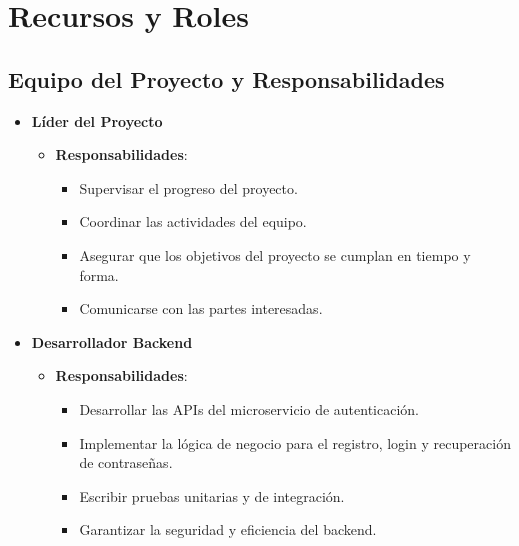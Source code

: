 \documentclass{article}
\begin{document}
\section{Recursos y Roles}

\subsection{Equipo del Proyecto y Responsabilidades}

\begin{itemize}
    \item \textbf{Líder del Proyecto}
          \begin{itemize}
              \item \textbf{Responsabilidades}:
                    \begin{itemize}
                        \item Supervisar el progreso del proyecto.
                        \item Coordinar las actividades del equipo.
                        \item Asegurar que los objetivos del proyecto se cumplan en tiempo y forma.
                        \item Comunicarse con las partes interesadas.
                    \end{itemize}
          \end{itemize}

    \item \textbf{Desarrollador Backend}
          \begin{itemize}
              \item \textbf{Responsabilidades}:
                    \begin{itemize}
                        \item Desarrollar las APIs del microservicio de autenticación.
                        \item Implementar la lógica de negocio para el registro, login y recuperación de contraseñas.
                        \item Escribir pruebas unitarias y de integración.
                        \item Garantizar la seguridad y eficiencia del backend.
                    \end{itemize}
          \end{itemize}


\end{itemize}
\end{document}
